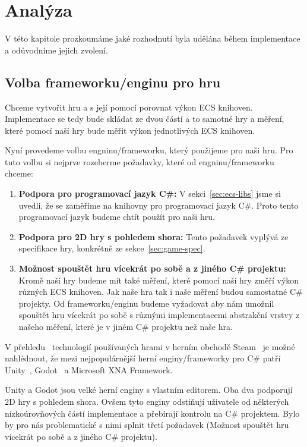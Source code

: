 \chapter{Analýza}
V této kapitole prozkoumáme jaké rozhodnutí byla udělána během implementace a odůvodníme jejich zvolení.


\section{Volba frameworku/enginu pro hru}
Chceme vytvořit hru a s její pomocí porovnat výkon ECS knihoven. Implementace se tedy bude skládat ze dvou částí a to samotné hry a měření, které pomocí naší hry bude měřit výkon jednotlivých ECS knihoven.

Nyní provedeme volbu engninu/frameworku, který použijeme pro naši hru. Pro tuto volbu si nejprve rozeberme požadavky, které od engninu/frameworku chceme:

\begin{enumerate}
    \item \textbf{Podpora pro programovací jazyk C\#:} V sekci~\ref{sec:ecs-libs} jsme si uvedli, že se zaměříme na knihovny pro programovací jazyk C\#. Proto tento programovací jazyk budeme chtít použít pro naši hru.
    \item \textbf{Podpora pro 2D hry s pohledem shora:} Tento požadavek vyplývá ze specifikace hry, konkrétně ze sekce~\ref{sec:game-spec}.
    \item \textbf{Možnost spouštět hru vícekrát po sobě a z jiného C\# projektu:} Kromě naší hry budeme mít také měření, které pomocí naší hry změří výkon různých ECS knihoven. Jak naše hra tak i naše měření budou samostatné C\# projekty. Od frameworku/enginu budeme vyžadovat aby nám umožnil spouštět hru vícekrát po sobě s různými implementacemi abstrakční vrstvy z našeho měření, které je v jiném C\# projektu než naše hra.    
\end{enumerate}

V přehledu~\cite{SteamDB} technologií používaných hrami v herním obchodě Steam~\cite{Steam} je možné nahlédnout, že mezi nejpopulárnější herní enginy/frameworky pro C\# patří Unity~\cite{Unity}, Godot~\cite{Godot} a Microsoft XNA Framework.

Unity a Godot jsou velké herní enginy s vlastním editorem. Oba dva podporují 2D hry s pohledem shora. Ovšem tyto enginy odstiňují uživatele od některých nízkoúrovňových částí implementace a přebírají kontrolu na C\# projektem. Bylo by pro nás problematické s nimi splnit třetí požadavek (Možnost spouštět hru vícekrát po sobě a z jiného C\# projektu).

